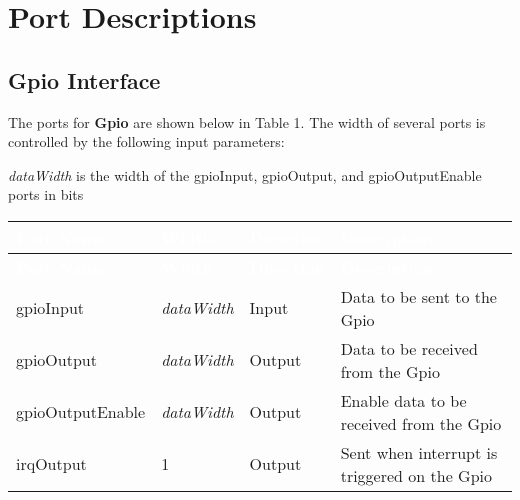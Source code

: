 \section{Port Descriptions}

\subsection{Gpio Interface}

The ports for \textbf{Gpio} are shown below in 
Table 1. The width of several ports is controlled 
by the following input parameters:

\textit{dataWidth} is the width of the gpioInput, gpioOutput, and gpioOutputEnable ports in bits
\renewcommand*{\arraystretch}{1.4}  %
 
\begingroup
\small

\begin{longtable}[H]{ 
  | p{}
  | p{}
  | p{}
  | p{} |
  }

\hline
\rowcolor{dark-gray}
\textcolor{white}{\textbf{Port Name}} & 
\textcolor{white}{\textbf{Width}} & 
\textcolor{white}{\textbf{Direction}} & 
\textcolor{white}{\textbf{Description}} \\ \hline
\endfirsthead

\hline
\rowcolor{dark-gray}
\textcolor{white}{\textbf{Port Name}} & 
\textcolor{white}{\textbf{Width}} & 
\textcolor{white}{\textbf{Direction}} & 
\textcolor{white}{\textbf{Description}}\\ \hline
\endhead

\hline
\endfoot

gpioInput &       
\textit{dataWidth} & 
Input &       
Data to be sent to the Gpio \\ \hline

gpioOutput &        
\textit{dataWidth} & 
Output &       
Data to be received from the Gpio \\ \hline

gpioOutputEnable &      
\textit{dataWidth} & 
Output &     
Enable data to be received from the Gpio \\ \hline

irqOutput &      
1 & 
Output &     
Sent when interrupt is triggered on the Gpio \\ \hline

\end{longtable}
\captionsetup{aboveskip=0pt}
\label{table:ports}
\endgroup


